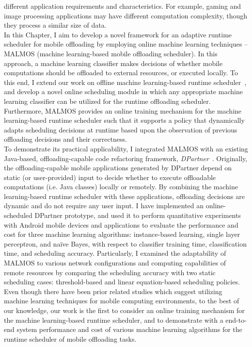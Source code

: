 different application requirements and characteristics.
%
For example, gaming and image processing applications may have different
computation complexity, though they process a similar size of data.\\
%
In this Chapter, I aim to develop a novel framework for an
adaptive runtime scheduler for mobile offloading by employing online
machine learning techniques -- MALMOS (machine learning-based mobile
offloading scheduler).
%
In this approach, a machine learning classifier makes decisions of
whether mobile computations should be offloaded to external resources,
or executed locally. 
%
To this end, I extend our work on offline machine
learning-based runtime scheduler~\cite{ml}, and develop a novel online
scheduling module in which any appropriate machine learning classifier
can be utilized for the runtime offloading scheduler.
%
Furthermore, MALMOS provides an online training mechanism for
the machine learning-based runtime scheduler such that it supports a
policy that dynamically adapts scheduling decisions at runtime based
upon the observation of previous offloading decisions and their
correctness.\\
%
To demonstrate its practical applicability, I integrated MALMOS
with an existing Java-based, offloading-capable code refactoring
framework, \textit{DPartner}~\cite{dpartner}.
%
Originally, the offloading-capable mobile applications generated by
DPartner depend on static (or user-provided) input to decide whether to
execute offloadable computations (i.e. Java classes) locally or remotely.
%
By combining the machine learning-based runtime scheduler with
these applications, offloading decisions are dynamic and do not require
any user input.
%
I have implemented an online-scheduled DPartner prototype, and used it
to perform quantitative experiments with Android mobile devices and
applications to evaluate the performance and cost for three machine
learning algorithms: instance-based learning, single layer perceptron, and na\"{i}ve
Bayes, with respect to classifier training time, classification time,
and scheduling accuracy.
%
Particularly, I examined the adaptability of MALMOS to various network
configurations and computing capabilities of remote resources by comparing
the scheduling accuracy with two static scheduling cases:
threshold-based and linear equation-based scheduling policies.
%
Even though there have been prior related studies which suggest
utilizing machine learning techniques for mobile computing environments,
to the best of our knowledge, our work is the first to consider an
online training mechanism for the machine learning-based runtime
scheduler, and to demonstrate with a end-to-end system performance and
cost of various machine learning algorithms for the runtime scheduler of
mobile offloading tasks.\\
%

